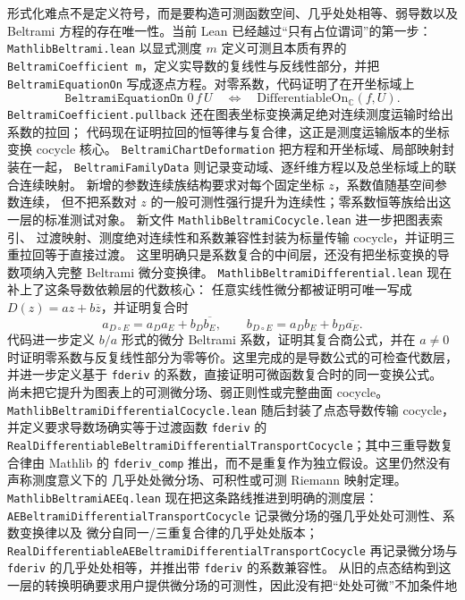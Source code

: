 \documentclass[UTF8,fontset=none,a4paper,11pt]{ctexart}
\begin{document}
形式化难点不是定义符号，而是要构造可测函数空间、几乎处处相等、弱导数以及 Beltrami 方程的存在唯一性。当前 Lean 已经越过“只有占位谓词”的第一步：
\texttt{MathlibBeltrami.lean} 以显式测度 $m$ 定义可测且本质有界的
\texttt{BeltramiCoefficient m}，定义实导数的复线性与反线性部分，并把
\texttt{BeltramiEquationOn} 写成逐点方程。对零系数，代码证明了在开坐标域上
\[
\texttt{BeltramiEquationOn }0\,f\,U
\quad\Longleftrightarrow\quad
\mathrm{DifferentiableOn}_{\mathbb C}(f,U).
\]
\texttt{BeltramiCoefficient.pullback} 还在图表坐标变换满足绝对连续测度运输时给出系数的拉回；
代码现在证明拉回的恒等律与复合律，这正是测度运输版本的坐标变换 cocycle 核心。
\texttt{BeltramiChartDeformation} 把方程和开坐标域、局部映射封装在一起，
\texttt{BeltramiFamilyData} 则记录变动域、逐纤维方程以及总坐标域上的联合连续映射。
新增的参数连续族结构要求对每个固定坐标 $z$，系数值随基空间参数连续，
但不把系数对 $z$ 的一般可测性强行提升为连续性；零系数恒等族给出这一层的标准测试对象。
新文件 \texttt{MathlibBeltramiCocycle}\allowbreak\texttt{.lean} 进一步把图表索引、
过渡映射、测度绝对连续性和系数兼容性封装为标量传输 cocycle，并证明三重拉回等于直接过渡。
这里明确只是系数复合的中间层，还没有把坐标变换的导数项纳入完整 Beltrami 微分变换律。
\texttt{MathlibBeltramiDifferential}\allowbreak\texttt{.lean} 现在补上了这条导数依赖层的代数核心：
任意实线性微分都被证明可唯一写成
\(D(z)=a z+b\overline z\)，并证明复合时
\[
 a_{D\circ E}=a_Da_E+b_D\overline{b_E},\qquad
 b_{D\circ E}=a_Db_E+b_D\overline{a_E}.
\]
代码进一步定义 \(b/a\) 形式的微分 Beltrami 系数，证明其复合商公式，并在
\(a\ne0\) 时证明零系数与反复线性部分为零等价。这里完成的是导数公式的可检查代数层，
并进一步定义基于 \texttt{fderiv} 的系数，直接证明可微函数复合时的同一变换公式。
尚未把它提升为图表上的可测微分场、弱正则性或完整曲面 cocycle。
\texttt{MathlibBeltramiDifferentialCocycle}\allowbreak\texttt{.lean} 随后封装了点态导数传输
cocycle，并定义要求导数场确实等于过渡函数 \texttt{fderiv} 的
\texttt{RealDifferentiableBeltramiDifferentialTransportCocycle}；其中三重导数复合律由
Mathlib 的 \texttt{fderiv\_comp} 推出，而不是重复作为独立假设。这里仍然没有声称测度意义下的
几乎处处微分场、可积性或可测 Riemann 映射定理。
\texttt{MathlibBeltramiAEEq}\allowbreak\texttt{.lean} 现在把这条路线推进到明确的测度层：
\texttt{AEBeltramiDifferentialTransportCocycle} 记录微分场的强几乎处处可测性、系数变换律以及
微分自同一/三重复合律的几乎处处版本；\texttt{RealDifferentiableAEBeltramiDifferentialTransportCocycle}
再记录微分场与 \texttt{fderiv} 的几乎处处相等，并推出带 \texttt{fderiv} 的系数兼容性。
从旧的点态结构到这一层的转换明确要求用户提供微分场的可测性，因此没有把“处处可微”不加条件地
\end{document}
